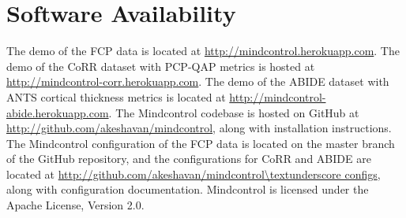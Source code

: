 \section{Software Availability}

The demo of the FCP data is located at \url{http://mindcontrol.herokuapp.com}. The demo of the CoRR dataset with PCP-QAP metrics is hosted at \url{http://mindcontrol-corr.herokuapp.com}. The demo of the ABIDE dataset with ANTS cortical thickness metrics is located at \url{http://mindcontrol-abide.herokuapp.com}. The Mindcontrol codebase is hosted on GitHub at \url{http://github.com/akeshavan/mindcontrol}, along with installation instructions. The Mindcontrol configuration of the FCP data is located on the master branch of the GitHub repository, and the configurations for CoRR and ABIDE are located at \url{http://github.com/akeshavan/mindcontrol\textunderscore configs}, along with configuration documentation. Mindcontrol is licensed under the Apache License, Version 2.0.

